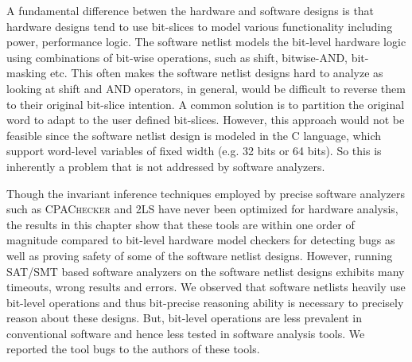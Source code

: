 A fundamental difference betwen the hardware and software designs is that 
hardware designs tend to use bit-slices to model various functionality 
including power, performance logic.  The software netlist models the 
bit-level hardware logic using combinations of bit-wise operations, 
such as shift, bitwise-AND, bit-masking etc.  
%
This often makes the software netlist designs hard to analyze 
as looking at shift and AND operators, in general, would be difficult 
to reverse them to their original bit-slice intention.
%
A common solution is to partition the original word to adapt to the user 
defined bit-slices.  However, this approach would not be feasible since 
the software netlist design is modeled in the C language, which support word-level 
variables of fixed width (e.g. 32 bits or 64 bits). So this is inherently 
a problem that is not addressed by software analyzers.

%
Though the invariant inference techniques employed by precise software 
analyzers such as \textsc{CPAChecker} and \textsc{2LS} have never
been optimized for hardware analysis, the results in this chapter 
show that these tools are within one order of magnitude compared to
bit-level hardware model checkers for detecting bugs as well as 
proving safety of some of the software netlist designs.  However, 
running SAT/SMT based software analyzers on the software netlist 
designs exhibits many 
timeouts, wrong results and errors.  We observed that software netlists 
heavily use bit-level operations and thus bit-precise reasoning ability 
is necessary to precisely reason about these designs.  But, bit-level 
operations are less prevalent in conventional software and hence less 
tested in software analysis tools.  We reported the tool bugs to the 
authors of these tools.


